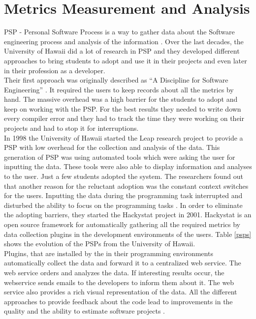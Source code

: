 \section{Metrics Measurement and Analysis}
PSP - Personal Software Process is a way to gather data about the Software engineering process and analysis of the information \cite{hayes1997textordfemininethe}.
Over the last decades, the University of Hawaii did a lot of research in PSP and they developed different approaches to bring students to adopt and use it in their projects and even later in their profession as a developer.\\
Their first approach was originally described as ``A Discipline for Software Engineering'' \cite{humphrey1995discipline}. It required the users to keep records about all the metrics by hand. The massive overhead was a high barrier for the students to adopt and keep on working with the PSP. For the best results they needed to write down every compiler error and they had to track the time they were working on their projects and had to stop it for interruptions.\\
In 1998 the University of Hawaii started the Leap research project to provide a PSP with low overhead for the collection and analysis of the data. This generation of PSP was using automated tools which were asking the user for inputting the data. These tools were also able to display information and analyses to the user.
Just a few students adopted the system. The researchers found out that another reason for the reluctant adoption was the constant context switches for the users. Inputting the data during the programming task interrupted and disturbed the ability to focus on the programming tasks \cite{johnson2003beyond}. 
In order to eliminate the adopting barriers, they started the Hackystat project in 2001. Hackystat is an open source framework for automatically gathering all the required metrics by data collection plugins in the development environments of the users. Table \ref{psps} shows the evolution of the PSPs from the University of Hawaii.\\
Plugins, that are installed by the in their programming environments automatically collect the data and forward it to a centralized web service. The web service orders and analyzes the data. If interesting results occur, the webservice sends emails to the developers to inform them about it. The web service also provides a rich visual representation of the data.
All the different approaches to provide feedback about the code lead to improvements in the quality and the ability to estimate software projects  \cite{johnson2001project}.
